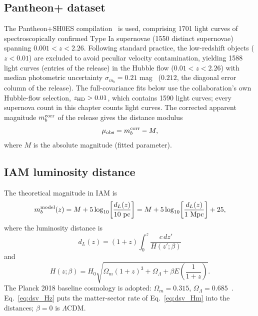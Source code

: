 \subsection{Pantheon+ dataset}
The Pantheon+SH0ES compilation~\cite{Brout2022,Scolnic2022} is used, comprising 1701 light curves of spectroscopically confirmed Type Ia supernovae
(1550 distinct supernovae) spanning $0.001<z<2.26$. Following standard practice, the low-redshift objects ($z<0.01$) are excluded to avoid peculiar
velocity contamination, yielding 1588 light curves (entries of the release) in the Hubble flow ($0.01<z<2.26$) with median photometric uncertainty $\sigma_{m_b}=0.21$ mag \observed\
($0.212$, the diagonal error column of the release). The full-covariance fits below use the collaboration's own Hubble-flow selection,
$z_{\rm HD}>0.01$, which contains 1590 light curves; every supernova count in this chapter counts light curves.
The corrected apparent magnitude $m_b^{\rm corr}$ of the release gives the distance modulus
\begin{equation}
\mu_{\rm obs}=m_b^{\rm corr}-M, \label{eq:dsv_mbcorr}
\end{equation}
where $M$ is the absolute magnitude (fitted parameter).

\subsection{IAM luminosity distance}
The theoretical magnitude in IAM is
\begin{equation}
m_b^{\rm model}(z)=M+5\log_{10}\!\left[\frac{d_L(z)}{10\ {\rm pc}}\right]=M+5\log_{10}\!\left[\frac{d_L(z)}{1\ {\rm Mpc}}\right]+25, \label{eq:dsv_mu}
\end{equation}
where the luminosity distance is
\begin{equation}
d_L(z)=(1+z)\int_0^z\frac{c\,dz'}{H(z';\beta)} \label{eq:dsv_dL}
\end{equation}
and
\begin{equation}
H(z;\beta)=H_0\sqrt{\Omega_m(1+z)^3+\Omega_\Lambda+\beta E\!\left(\frac{1}{1+z}\right)}. \label{eq:dsv_Hz}
\end{equation}
The Planck 2018 baseline cosmology is adopted: $\Omega_m=0.315$, $\Omega_\Lambda=0.685$~\cite{Planck2018VI}. Eq.~\eqref{eq:dsv_Hz} puts the matter-sector
rate of Eq.~\eqref{eq:dsv_Hm} into the distances; $\beta=0$ is $\Lambda$CDM. \derived{}

